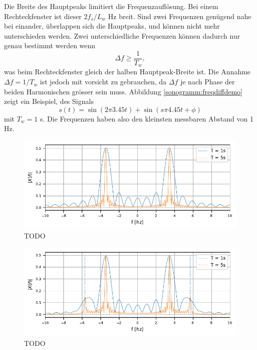 Die Breite des Hauptpeaks limitiert die Frequenzauflösung.
Bei einem Rechteckfenster ist dieser $2f_s/L_w$ Hz breit.
Sind zwei Frequenzen genügend nahe bei einander, überlappen sich die Hauptpeaks, und können
nicht mehr unterschieden werden. 
Zwei unterschiedliche Frequenzen können dadurch nur genau bestimmt werden wenn
\begin{equation}
    \Delta f \geq \frac{1}{T_w},
\end{equation}
was beim Rechteckfenster gleich der halben Hauptpeak-Breite ist.
Die Annahme $\Delta f = 1/T_w$ ist jedoch mit vorsicht zu gebrauchen, da $\Delta f$ je nach 
Phase der beiden Harmonischen grösser sein muss.
Abbildung \ref{sonogramm:freqdiffdemo} zeigt ein Beispiel, des Signals
\begin{equation}
    s(t) = \sin(2\pi 3.45 t ) + \sin (s\pi 4.45 t + \phi)
\end{equation}
mit $T_w = 1$ s.
Die Frequenzen haben also den kleinsten messbaren Abstand von 1 Hz.


\begin{figure}
    \centering
    \includegraphics{papers/sonogramm/images/RectWinHarmEx.pdf}
    \caption{TODO
    \label{sonogramm:leakageDemo}
    }
\end{figure}

\begin{figure}
    \centering
    \includegraphics{papers/sonogramm/images/twohamrrect.pdf}
    \caption{TODO
    \label{sonogramm:leakageDemo2}
    }
\end{figure}

